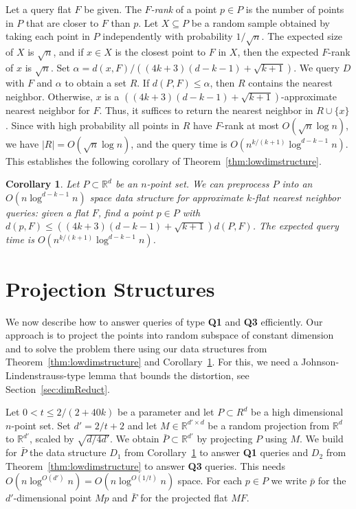 \documentclass[a4paper,11pt]{paper}
\newcommand{\mathset}[1]{\ensuremath {\mathbb {#1}}}
\newcommand{\R}{\mathset{R}}
\newcommand{\lowdimapprox}[1][]{(4k+3)(d#1-k-1)+\sqrt{k+1}}
\newtheorem{corollary}[theorem]{Corollary}
\begin{document}
Let a query flat $F$ be given.
The \emph{$F$-rank} of a point $p \in P$ is the number of
points in $P$ that are closer to $F$ than $p$.
Let $X \subseteq P$ be a random sample obtained by
taking each point in $P$ independently with probability $1/\sqrt{n}$.
The expected size of $X$ is $\sqrt{n}$, and if $x \in X$ is the
closest point
to $F$ in $X$, then the expected $F$-rank of $x$ is $\sqrt{n}$. Set
$\alpha = d(x,F)/(\lowdimapprox)$. We query
$D$ with $F$ and $\alpha$ to obtain a set $R$.
If $d(P,F) \leq \alpha$, then
$R$ contains the nearest neighbor. Otherwise, $x$ is a
$(\lowdimapprox)$-approximate nearest neighbor for $F$.
Thus, it suffices to return the nearest neighbor in $R \cup \{x\}$.
Since with high probability all
points in $R$ have $F$-rank at most $O(\sqrt{n}\log n)$,
we have $|R| = O(\sqrt{n}\log n)$, and the query time is
$O(n^{k/(k+1)}\log^{d-k-1} n)$.
This establishes the following corollary of
Theorem~\ref{thm:lowdimstructure}.
\begin{corollary}
\label{cor:lowdimapprox}
Let $P \subset \R^d$ be an $n$-point set.
We can preprocess $P$ into an
$O(n\log^{d-k-1} n)$ space data structure
for approximate $k$-flat nearest neighbor queries:
given a flat $F$, find a point
$p \in P$ with $d(p,F) \leq (\lowdimapprox) d(P,F)$.
The expected query time is
$O(n^{k/(k+1)}\log^{d-k-1} n)$.
\end{corollary}

\section{Projection Structures}
\label{sec:projectionstructures}

We now describe how to answer queries of type
\textbf{Q1} and \textbf{Q3} efficiently. Our approach is
to project the points into  random subspace of constant dimension
and to solve the problem there using our data structures from
Theorem~\ref{thm:lowdimstructure} and
Corollary~\ref{cor:lowdimapprox}.
For this, we need a Johnson-Lindenstrauss-type lemma that bounds the
distortion, see Section~\ref{sec:dimReduct}.

Let $0 < t \leq 2/(2+40k)$ be a parameter
and let $P \subset R^d$ be a high dimensional $n$-point set.
Set $d' = 2/t + 2$ and
let $M \in \R^{d'\times d}$ be a random projection from
$\R^{d}$ to $\R^{d'}$, scaled by $\sqrt{d/4d'}$.
We obtain $\bar{P} \subset \R^{d'}$ by projecting $P$ using $M$.
We build for $\bar{P}$ the
data structure $D_1$ from Corollary~\ref{cor:lowdimapprox} to answer
\textbf{Q1} queries and $D_2$ from Theorem~\ref{thm:lowdimstructure}
to answer \textbf{Q3} queries.
This needs $O(n \log^{O(d')}n) = O(n\log^{O(1/t)}n)$ space.
For each $p \in P$ we write $\bar{p}$ for the
$d'$-dimensional point $Mp$ and $\bar{F}$ for the projected
flat $MF$.
\end{document}

